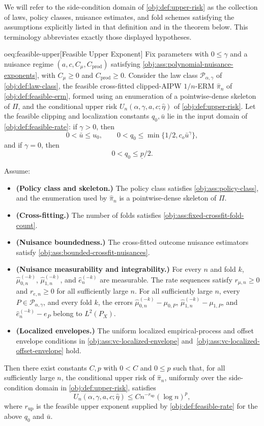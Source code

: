 \documentclass[11pt]{article}
\begin{document}
We will refer to the side-condition domain of \cref{obj:def:upper-risk} as the collection of laws, policy classes, nuisance estimates, and fold schemes satisfying the assumptions explicitly listed in that definition and in the theorem below.  This terminology abbreviates exactly those displayed hypotheses.

\begin{theoremv}{oeq:feasible-upper}[Feasible Upper Exponent]
Fix parameters with \(0\le \gamma\) and a nuisance regime \((a,c,C_\mu,C_{\mathrm{prod}})\) satisfying \cref{obj:ass:polynomial-nuisance-exponents}, with \(C_\mu\ge0\) and \(C_{\mathrm{prod}}\ge0\). Consider the law class \(\mathcal P_{\alpha,\gamma}\) of \cref{obj:def:law-class}, the feasible cross-fitted clipped-AIPW \(1/n\)-ERM \(\widehat\pi_n\) of \cref{obj:def:feasible-erm}, formed using an enumeration of a pointwise-dense skeleton of \(\Pi\), and the conditional upper risk \(U_n(\alpha,\gamma,a,c;\widehat\eta)\) of \cref{obj:def:upper-risk}. Let the feasible clipping and localization constants \(q_0,\bar u\) lie in the input domain of \cref{obj:def:feasible-rate}: if \(\gamma>0\), then
\[
0<\bar u\le u_0,\qquad 0<q_0\le \min\{1/2,c_o\bar u^\gamma\},
\]
and if \(\gamma=0\), then
\[
0<q_0\le \underline p/2.
\]

Assume:
\begin{itemize}
\item \textbf{(Policy class and skeleton.)} The policy class satisfies \cref{obj:ass:policy-class}, and the enumeration used by \(\widehat\pi_n\) is a pointwise-dense skeleton of \(\Pi\).
\item \textbf{(Cross-fitting.)} The number of folds satisfies \cref{obj:ass:fixed-crossfit-fold-count}.
\item \textbf{(Nuisance boundedness.)} The cross-fitted outcome nuisance estimators satisfy \cref{obj:ass:bounded-crossfit-nuisances}.
\item \textbf{(Nuisance measurability and integrability.)} For every \(n\) and fold \(k\), \(\widehat\mu_{0,n}^{(-k)}\), \(\widehat\mu_{1,n}^{(-k)}\), and \(\widehat e_n^{(-k)}\) are measurable. The rate sequences satisfy \(r_{\mu,n}\ge0\) and \(r_{e,n}\ge0\) for all sufficiently large \(n\). For all sufficiently large \(n\), every \(P\in\mathcal P_{\alpha,\gamma}\), and every fold \(k\), the errors \(\widehat\mu_{0,n}^{(-k)}-\mu_{0,P}\), \(\widehat\mu_{1,n}^{(-k)}-\mu_{1,P}\), and \(\widehat e_n^{(-k)}-e_P\) belong to \(L^2(P_X)\).
\item \textbf{(Localized envelopes.)} The uniform localized empirical-process and offset envelope conditions in \cref{obj:ass:vc-localized-envelope} and~\cref{obj:ass:vc-localized-offset-envelope} hold.
\end{itemize}

Then there exist constants \(C,p\) with \(0<C\) and \(0\le p\) such that, for all sufficiently large \(n\), the conditional upper risk of \(\widehat\pi_n\), uniformly over the side-condition domain in \cref{obj:def:upper-risk}, satisfies
\[
U_n(\alpha,\gamma,a,c;\widehat\eta)\le C n^{-r_{\mathrm{up}}}(\log n)^p,
\]
where \(r_{\mathrm{up}}\) is the feasible upper exponent supplied by \cref{obj:def:feasible-rate} for the above \(q_0\) and \(\bar u\).
\end{theoremv}
\end{document}
